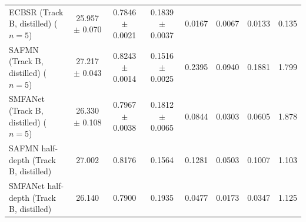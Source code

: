 \documentclass[11pt]{article}
\begin{document}
\begin{table}[H]
{\begin{tabular}{lccccccc}
ECBSR (Track B, distilled) ($n=5$)      & 25.957 $\pm$ 0.070 & 0.7846 $\pm$ 0.0021 & 0.1839 $\pm$ 0.0037 & 0.0167 & 0.0067 & 0.0133 & 0.135 \\
SAFMN (Track B, distilled) ($n=5$)      & 27.217 $\pm$ 0.043 & 0.8243 $\pm$ 0.0014 & 0.1516 $\pm$ 0.0025 & 0.2395 & 0.0940 & 0.1881 & 1.799 \\
SMFANet (Track B, distilled) ($n=5$)    & 26.330 $\pm$ 0.108 & 0.7967 $\pm$ 0.0038 & 0.1812 $\pm$ 0.0065 & 0.0844 & 0.0303 & 0.0605 & 1.878 \\
SAFMN half-depth (Track B, distilled)   & 27.002 & 0.8176 & 0.1564 & 0.1281 & 0.0503 & 0.1007 & 1.103 \\
SMFANet half-depth (Track B, distilled) & 26.140 & 0.7900 & 0.1935 & 0.0477 & 0.0173 & 0.0347 & 1.125 \\
\bottomrule
\end{tabular}%
}
\end{table}
\end{document}
